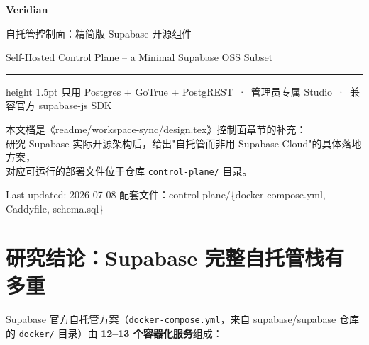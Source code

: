 \documentclass[12pt, a4paper]{article}
\begin{document}
\begin{titlepage}
  \centering
  \vspace*{2.5cm}
  {\Huge\bfseries\color{tsinghuapurple} Veridian}\par
  \vspace{0.6em}
  {\Large\color{sectionblue} 自托管控制面：精简版 Supabase 开源组件}\par
  \vspace{0.4em}
  {\large Self-Hosted Control Plane -- a Minimal Supabase OSS Subset}\par
  \vspace{2em}
  \hrule height 1.5pt \relax
  \vspace{2em}
  {\normalsize 只用 Postgres + GoTrue + PostgREST \,·\, 管理员专属 Studio \,·\, 兼容官方 supabase-js SDK}\par
  \vspace{3cm}
  {\small
  本文档是《readme/workspace-sync/design.tex》控制面章节的补充：\\
  研究 Supabase 实际开源架构后，给出"自托管而非用 Supabase Cloud"的具体落地方案，\\
  对应可运行的部署文件位于仓库 \texttt{control-plane/} 目录。
  }\par
  \vfill
  {\small\color{gray} Last updated: 2026-07-08 \quad 配套文件：control-plane/\{docker-compose.yml, Caddyfile, schema.sql\}}
\end{titlepage}

\tableofcontents
\newpage

\section{研究结论：Supabase 完整自托管栈有多重}

Supabase 官方自托管方案（\texttt{docker-compose.yml}，来自
\href{https://github.com/supabase/supabase}{supabase/supabase} 仓库的
\texttt{docker/} 目录）由 \textbf{12--13 个容器化服务}组成：
\end{document}
